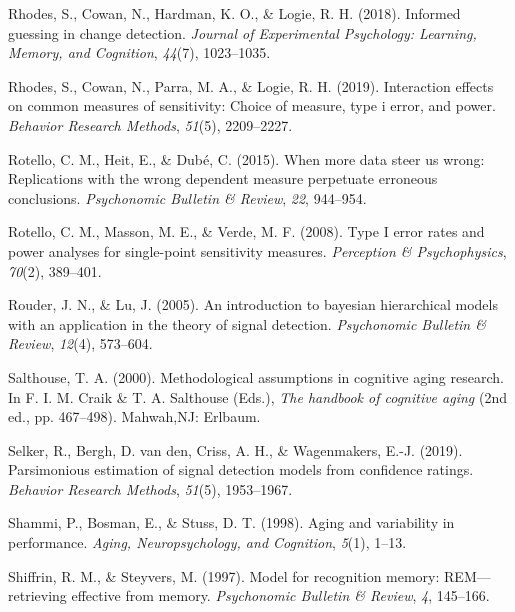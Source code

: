 \documentclass[
  english,
  ,man,floatsintext]{apa6}
\begin{document}
\leavevmode\hypertarget{ref-RhodesEtAl2018}{}%
Rhodes, S., Cowan, N., Hardman, K. O., \& Logie, R. H. (2018). Informed guessing in change detection. \emph{Journal of Experimental Psychology: Learning, Memory, and Cognition}, \emph{44}(7), 1023--1035.

\leavevmode\hypertarget{ref-rhodes2019interaction}{}%
Rhodes, S., Cowan, N., Parra, M. A., \& Logie, R. H. (2019). Interaction effects on common measures of sensitivity: Choice of measure, type i error, and power. \emph{Behavior Research Methods}, \emph{51}(5), 2209--2227.

\leavevmode\hypertarget{ref-RotelloEtAl2015}{}%
Rotello, C. M., Heit, E., \& Dubé, C. (2015). When more data steer us wrong: Replications with the wrong dependent measure perpetuate erroneous conclusions. \emph{Psychonomic Bulletin \& Review}, \emph{22}, 944--954.

\leavevmode\hypertarget{ref-RotelloEtAl2008}{}%
Rotello, C. M., Masson, M. E., \& Verde, M. F. (2008). Type I error rates and power analyses for single-point sensitivity measures. \emph{Perception \& Psychophysics}, \emph{70}(2), 389--401.

\leavevmode\hypertarget{ref-rouder2005introduction}{}%
Rouder, J. N., \& Lu, J. (2005). An introduction to bayesian hierarchical models with an application in the theory of signal detection. \emph{Psychonomic Bulletin \& Review}, \emph{12}(4), 573--604.

\leavevmode\hypertarget{ref-Salthouse2000}{}%
Salthouse, T. A. (2000). Methodological assumptions in cognitive aging research. In F. I. M. Craik \& T. A. Salthouse (Eds.), \emph{The handbook of cognitive aging} (2nd ed., pp. 467--498). Mahwah,NJ: Erlbaum.

\leavevmode\hypertarget{ref-selker2019parsimonious}{}%
Selker, R., Bergh, D. van den, Criss, A. H., \& Wagenmakers, E.-J. (2019). Parsimonious estimation of signal detection models from confidence ratings. \emph{Behavior Research Methods}, \emph{51}(5), 1953--1967.

\leavevmode\hypertarget{ref-shammi1998aging}{}%
Shammi, P., Bosman, E., \& Stuss, D. T. (1998). Aging and variability in performance. \emph{Aging, Neuropsychology, and Cognition}, \emph{5}(1), 1--13.

\leavevmode\hypertarget{ref-ShiffrinAndSteyvers1997}{}%
Shiffrin, R. M., \& Steyvers, M. (1997). Model for recognition memory: REM---retrieving effective from memory. \emph{Psychonomic Bulletin \& Review}, \emph{4}, 145--166.
\end{document}
